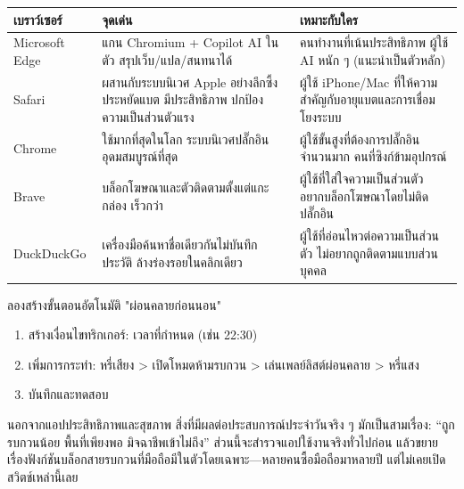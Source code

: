 
\begin{center}
\begin{tabularx}{\linewidth}{|X|X|X|}
\hline
\textbf{เบราว์เซอร์} & \textbf{จุดเด่น} & \textbf{เหมาะกับใคร} \tabularnewline
\hline
Microsoft Edge & แกน Chromium + Copilot AI ในตัว สรุปเว็บ/แปล/สนทนาได้ & คนทำงานที่เน้นประสิทธิภาพ ผู้ใช้ AI หนัก ๆ (แนะนำเป็นตัวหลัก) \tabularnewline
Safari & ผสานกับระบบนิเวศ Apple อย่างลึกซึ้ง ประหยัดแบต มีประสิทธิภาพ ปกป้องความเป็นส่วนตัวแรง & ผู้ใช้ iPhone/Mac ที่ให้ความสำคัญกับอายุแบตและการเชื่อมโยงระบบ \tabularnewline
Chrome & ใช้มากที่สุดในโลก ระบบนิเวศปลั๊กอินอุดมสมบูรณ์ที่สุด & ผู้ใช้ขั้นสูงที่ต้องการปลั๊กอินจำนวนมาก คนที่ซิงก์ข้ามอุปกรณ์ \tabularnewline
Brave & บล็อกโฆษณาและตัวติดตามตั้งแต่แกะกล่อง เร็วกว่า & ผู้ใช้ที่ใส่ใจความเป็นส่วนตัว อยากบล็อกโฆษณาโดยไม่ติดปลั๊กอิน \tabularnewline
DuckDuckGo & เครื่องมือค้นหาชื่อเดียวกันไม่บันทึกประวัติ ล้างร่องรอยในคลิกเดียว & ผู้ใช้ที่อ่อนไหวต่อความเป็นส่วนตัว ไม่อยากถูกติดตามแบบส่วนบุคคล \tabularnewline
\hline
\end{tabularx}
\end{center}

\begin{tcbpractice}{ลองสร้างขั้นตอนอัตโนมัติ "ผ่อนคลายก่อนนอน"}
\begin{enumerate}
  \item สร้างเงื่อนไขทริกเกอร์: เวลาที่กำหนด (เช่น 22:30)
  \item เพิ่มการกระทำ: หรี่เสียง > เปิดโหมดห้ามรบกวน > เล่นเพลย์ลิสต์ผ่อนคลาย > หรี่แสง
  \item บันทึกและทดสอบ
\end{enumerate}

\end{tcbpractice}


นอกจากแอปประสิทธิภาพและสุขภาพ สิ่งที่มีผลต่อประสบการณ์ประจำวันจริง ๆ มักเป็นสามเรื่อง: “ถูกรบกวนน้อย พื้นที่เพียงพอ มิจฉาชีพเข้าไม่ถึง” ส่วนนี้จะสำรวจแอปใช้งานจริงทั่วไปก่อน แล้วขยายเรื่องฟังก์ชันบล็อกสายรบกวนที่มือถือมีในตัวโดยเฉพาะ—หลายคนซื้อมือถือมาหลายปี แต่ไม่เคยเปิดสวิตช์เหล่านี้เลย


